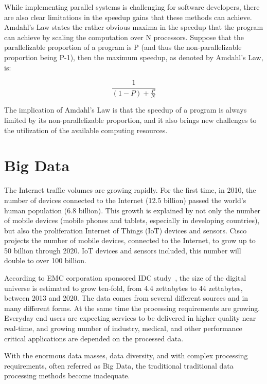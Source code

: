 While implementing parallel systems is challenging for software developers, there are also clear limitations in the speedup gains that these methods can achieve. Amdahl's Law states the rather obvious maxima in the speedup that the program can achieve by scaling the computation over N processors. Suppose that the parallelizable proportion of a program is P (and thus the non-parallelizable proportion being P-1), then the maximum speedup, as denoted by Amdahl's Law, is:~\cite{Amdahl:1967:VSP}

\begin{equation*}
  \frac{1}{(1-P) + \frac{P}{N}}
\end{equation*}

The implication of Amdahl's Law is that the speedup of a program is always limited by its non-parallelizable proportion, and it also brings new challenges to the utilization of the available computing resources.

\section{Big Data}
\label{section:big-data}
The Internet traffic volumes are growing rapidly. For the first time, in 2010, the number of devices connected to the Internet (12.5 billion) passed the world's human population (6.8 billion). This growth is explained by not only the number of mobile devices (mobile phones and tablets, especially in developing countries), but also the proliferation Internet of Things (IoT) devices and sensors. Cisco projects the number of mobile devices, connected to the Internet, to grow up to 50 billion through 2020. IoT devices and sensors included, this number will double to over 100 billion.~\cite{Evans:2011:IoT}

According to EMC corporation sponsored IDC study~\cite{Turner:2014:Digital}, the size of the digital universe is estimated to grow ten-fold, from 4.4 zettabytes to 44 zettabytes, between 2013 and 2020. The data comes from several different sources and in many different forms. At the same time the processing requirements are growing. Everyday end users are expecting services to be delivered in higher quality near real-time, and growing number of industry, medical, and other performance critical applications are depended on the processed data.

With the enormous data masses, data diversity, and with complex processing requirements, often referred as Big Data, the traditional traditional data processing methods become inadequate.


